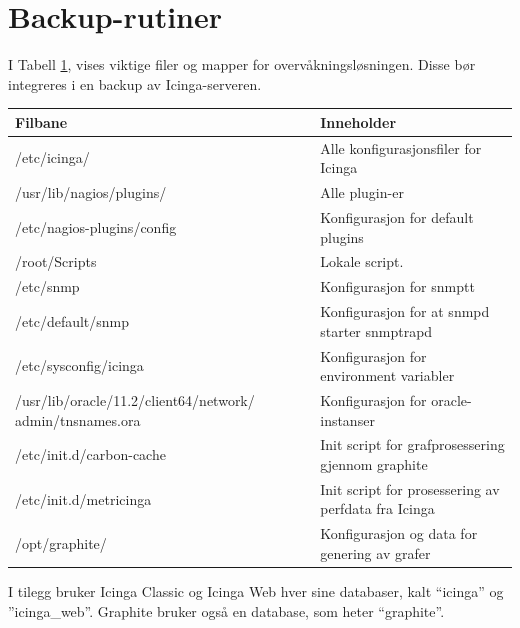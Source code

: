\section{Backup-rutiner}
I Tabell \ref{backup}, vises viktige filer og mapper for overvåkningsløsningen. Disse bør integreres i en backup av Icinga-serveren.
\begin{table} \label{backup}
\begin{center}
\begin{tabular}{| p{8cm} | p{8cm} |}
 \hline
        \textbf{Filbane} & \textbf{Inneholder}
	\\ \hline
	/etc/icinga/						& Alle konfigurasjonsfiler for Icinga \\ \hline
	/usr/lib/nagios/plugins/				& Alle plugin-er \\ \hline
	/etc/nagios-plugins/config				& Konfigurasjon for default plugins \\ \hline
	/root/Scripts						& Lokale script. \\ \hline
	/etc/snmp 						& Konfigurasjon for snmptt \\ \hline
	/etc/default/snmp 					& Konfigurasjon for at snmpd starter snmptrapd \\ \hline
	/etc/sysconfig/icinga					& Konfigurasjon for environment variabler \\ \hline
	/usr/lib/oracle/11.2/client64/network/
	admin/tnsnames.ora					& Konfigurasjon for oracle-instanser \\ \hline
	/etc/init.d/carbon-cache				& Init script for grafprosessering gjennom graphite \\ \hline
	/etc/init.d/metricinga					& Init script for prosessering av perfdata fra Icinga \\ \hline
	/opt/graphite/						& Konfigurasjon og data for genering av grafer  \\ \hline
\end{tabular}
\end{center}
\end{table}
I tilegg bruker Icinga Classic og Icinga Web hver sine databaser, kalt ``icinga'' og ''icinga\_web''. Graphite bruker også en database, som heter ``graphite''.

